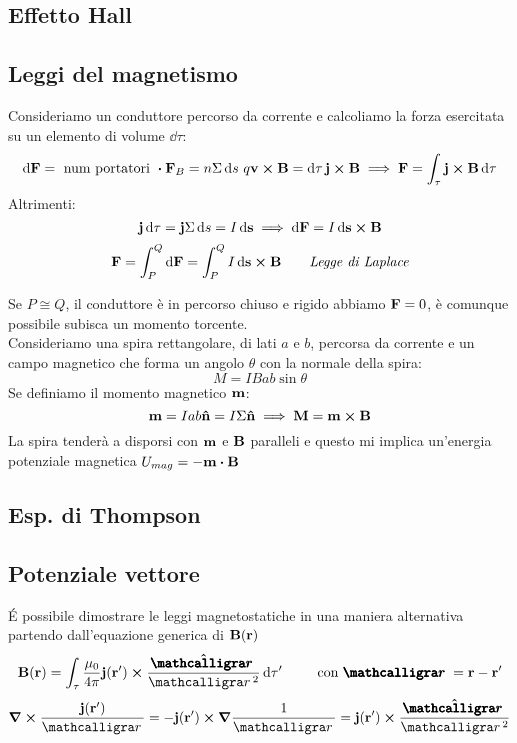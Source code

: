 \documentclass[12pt,a4paper]{article}
\begin{document}
\subsection{Effetto Hall}


\subsection{Leggi del magnetismo}
Consideriamo un conduttore percorso da corrente e calcoliamo la forza esercitata su un elemento di volume $\dd{\tau}$:
\begin{equation*}
    \dd{\vb{F}}=\text{ num portatori }\vdot \vb{F}_B= n \Sigma\dd{s}\,q\vb{v}\cp\vb{B}= \dd{\tau} \vb{j}\cp\vb{B} 
    \implies \vb{F}= \int _\tau\vb{j}\cp \vb{B}\dd{\tau} 
\end{equation*}
Altrimenti:
\begin{equation*}
    \vb{j}\dd{\tau}= \vb{j}\Sigma\dd{s}= I \dd{\vb{s}} \implies \dd{\vb{F}}= I \dd{\vb{s}}\cp\vb{B} 
\end{equation*}
\begin{equation*}
    \vb{F}= \int_{P}^{Q}\dd{\vb{F}}= \int_{P}^{Q}I\dd{\vb{s}}\cp\vb{B} \qquad \textit{Legge di Laplace}
\end{equation*}

Se $P\cong Q$, il conduttore è in percorso chiuso e rigido abbiamo $\vb{F}= 0$, è comunque possibile subisca un momento torcente.
\\Consideriamo una spira rettangolare, di lati $a$ e $b$, percorsa da corrente e un campo magnetico che forma un angolo $\theta$ con la normale della spira:
\begin{equation*}
    M= IBab\sin\theta
\end{equation*}
Se definiamo il momento magnetico $\vb{m}$:
\begin{equation*}
    \vb{m}= Iab\vu{n}= I\Sigma\vu{n}\implies \vb{M}= \vb{m}\cp\vb{B}
\end{equation*}
La spira tenderà a disporsi con $\vb{m}$ e $\vb{B}$ paralleli e questo mi implica un'energia potenziale magnetica $U_{mag}= -\vb{m}\vdot\vb{B}$


\subsection{Esp. di Thompson}

\subsection{Potenziale vettore}
\'{E} possibile dimostrare le leggi magnetostatiche in una maniera alternativa partendo dall'equazione generica di $\vb{B}(\vb{r})$
\begin{equation*}
    \vb{B}(\vb{r})= \int_\tau\frac{\mu_0}{4\pi}\vb{j}(\vb{r}')\cp\frac{\vu{\boldscriptr}}{\scriptr^2}\dd{\tau'} \qquad\text{ con } 
    \boldscriptr= \vb{r}-\vb{r}'
\end{equation*}
\begin{equation*}
    \curl \frac{\vb{j}(\vb{r}')}{\scriptr}= -\vb{j}(\vb{r}')\cp\grad{\frac{1}{\scriptr}}= \vb{j}(\vb{r}')\cp\frac{\vu{\boldscriptr}}{\scriptr^2}
\end{equation*}
\end{document}

